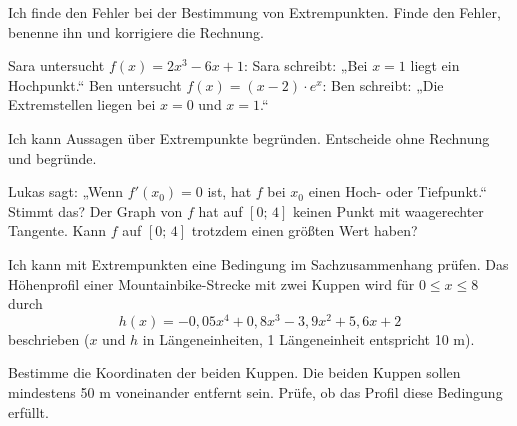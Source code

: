 \begin{aufgabe}{Ich finde den Fehler bei der Bestimmung von Extrempunkten.}
Finde den Fehler, benenne ihn und korrigiere die Rechnung.
\begin{teile}
\teil Sara untersucht $f(x) = 2x^3 - 6x + 1$:
Sara schreibt: „Bei $x = 1$ liegt ein Hochpunkt.“
\teil Ben untersucht $f(x) = (x - 2)\cdot e^{x}$:
Ben schreibt: „Die Extremstellen liegen bei $x = 0$ und $x = 1$.“
\end{teile}
\end{aufgabe}

\begin{aufgabe}{Ich kann Aussagen über Extrempunkte begründen.}
Entscheide ohne Rechnung und begründe.
\begin{teile}
\teil Lukas sagt: „Wenn $f'(x_0) = 0$ ist, hat $f$ bei $x_0$ einen Hoch- oder Tiefpunkt.“ Stimmt das?
\teil Der Graph von $f$ hat auf $[0;\,4]$ keinen Punkt mit waagerechter Tangente. Kann $f$ auf $[0;\,4]$ trotzdem einen größten Wert haben?
\end{teile}
\end{aufgabe}

\begin{aufgabe}{Ich kann mit Extrempunkten eine Bedingung im Sachzusammenhang prüfen.}
Das Höhenprofil einer Mountainbike-Strecke mit zwei Kuppen wird für $0 \le x \le 8$ durch
\[ h(x) = -0{,}05x^4 + 0{,}8x^3 - 3{,}9x^2 + 5{,}6x + 2 \]
beschrieben ($x$ und $h$ in Längeneinheiten, 1 Längeneinheit entspricht 10 m).
\begin{teile}
\teil Bestimme die Koordinaten der beiden Kuppen.
\teil Die beiden Kuppen sollen mindestens 50 m voneinander entfernt sein. Prüfe, ob das Profil diese Bedingung erfüllt.
\end{teile}
\end{aufgabe}
